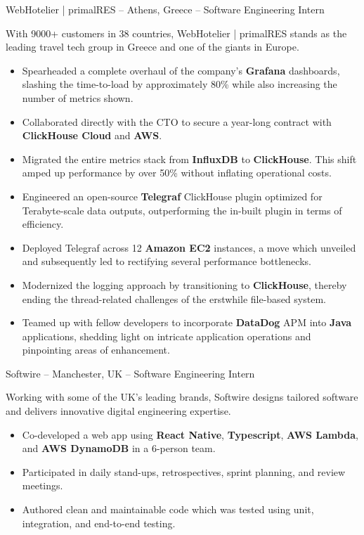 \documentclass[]{prometheus_cv}
\begin{document}
{}
{WebHotelier | primalRES -- Athens, Greece -- Software Engineering Intern}
{
    With 9000+ customers in 38 countries, WebHotelier | primalRES stands as the leading travel tech group in Greece and one of the giants in Europe.
    \begin{itemize}
        \item Spearheaded a complete overhaul of the company's \textbf{Grafana} dashboards, slashing the time-to-load by approximately 80\% while also increasing the number of metrics shown.
        \item Collaborated directly with the CTO to secure a year-long contract with \textbf{ClickHouse Cloud} and \textbf{AWS}.
        \item Migrated the entire metrics stack from \textbf{InfluxDB} to \textbf{ClickHouse}. This shift amped up performance by over 50\% without inflating operational costs.
        \item Engineered an open-source \textbf{Telegraf} ClickHouse plugin optimized for Terabyte-scale data outputs, outperforming the in-built plugin in terms of efficiency.
        \item Deployed Telegraf across 12 \textbf{Amazon EC2} instances, a move which unveiled and subsequently led to rectifying several performance bottlenecks.
        \item Modernized the logging approach by transitioning to \textbf{ClickHouse}, thereby ending the thread-related challenges of the erstwhile file-based system.
        \item Teamed up with fellow developers to incorporate \textbf{DataDog} APM into \textbf{Java} applications, shedding light on intricate application operations and pinpointing areas of enhancement.
    \end{itemize}
}

{}
{Softwire -- Manchester, UK -- Software Engineering Intern}
{
    Working with some of the UK's leading brands, Softwire designs tailored software and delivers innovative digital engineering expertise.
    \begin{itemize}
        \item Co-developed a web app using \textbf{React Native}, \textbf{Typescript}, \textbf{AWS Lambda}, and \textbf{AWS DynamoDB} in a 6-person team.
        \item Participated in daily stand-ups, retrospectives, sprint planning, and review meetings.
        \item Authored clean and maintainable code which was tested using unit, integration, and end-to-end testing.
    \end{itemize}
}
\end{document}
